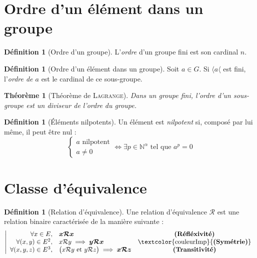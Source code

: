 \documentclass[11pt,a4paper]{report}
\newtheorem{itheorem}[theorem]{Théorème}
\theoremstyle{definition}
\newtheorem{dfn}[theorem]{Définition}
\begin{document}
\section{Ordre d'un élément dans un groupe} %
\label{sec:ordre_d_un_element_dans_un_groupe}
\begin{dfn}[Ordre d'un groupe]
     L'\emph{ordre} d'un groupe fini est son cardinal $n$.
\end{dfn}
\begin{dfn}[Ordre d'un élément dans un groupe]
     Soit $a\in G$. Si $\langle a \langle$ est fini, l'\emph{ordre de $a$} est le cardinal de ce sous-groupe.
\end{dfn}
\begin{itheorem}[Théorème de \textsc{Lagrange}]
     Dans un groupe fini, l'ordre d'un sous-groupe est un \emph{diviseur} de l'ordre du groupe.
\end{itheorem}
\begin{dfn}[Éléments nilpotents]
Un élément est \emph{nilpotent} si, composé par lui même, il peut être nul : 
\begin{equation}
\left\lbrace \begin{array}{l} a\text{ nilpotent}\\ a\neq 0 \end{array}\right. \Leftrightarrow \exists p \in \mathbb{N}^{\alpha} \text{ tel que } a^p =0 
\end{equation}
\end{dfn}

\section{Classe d'équivalence}
\begin{dfn}[Relation d'équivalence]
Une relation d'équivalence $\mathcal{R}$ est une relation binaire caractérisée de la manière suivante : 
\begin{equation}
\left|
\begin{array}{r l c}
\forall x \in E,& \boldsymbol{x\mathcal{R}x} & \text{\textbf{(Réfléxivité)}}\\
\forall (x,y) \in E^2, & x\mathcal{R}y\implies \boldsymbol{y\mathcal{R}x} &\text{\textcolor{couleurImp}{\textbf{(Symétrie)}}}\\
\forall (x,y,z) \in E^3, & \big( x\mathcal{R}y \text{ et } y\mathcal{R}z \big) \implies \boldsymbol{x\mathcal{R}z} & \text{\textbf{(Transitivité)}}
\end{array}
\right.
\end{equation}
\end{dfn}
\end{document}
